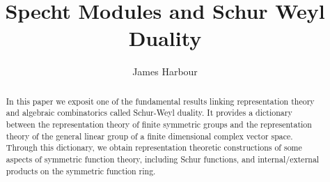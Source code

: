 \documentclass[12pt]{article}
\title{Specht Modules and Schur Weyl Duality}
\author{James Harbour}
\begin{document}
\maketitle

\begin{abstract}
  In this paper we exposit one of the fundamental results linking representation theory and algebraic combinatorics called Schur-Weyl duality. It provides a dictionary between the representation theory of finite symmetric groups and the representation theory of the general linear group of a finite dimensional complex vector space. Through this dictionary, we obtain representation theoretic constructions of some aspects of symmetric function theory, including Schur functions, and internal/external products on the symmetric function ring.
\end{abstract}

\tableofcontents










%





\printbibliography
\end{document}
